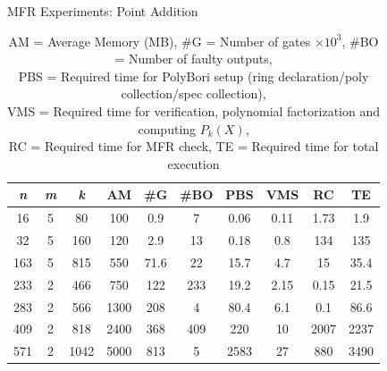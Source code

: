 \begin{frame}{\large MFR Experiments: Point Addition}

{\scriptsize
\begin{table}[bht]
\centering
\caption*{{\scriptsize AM = Average Memory (MB),
\#G = Number of gates $\times 10^3$, \#BO = Number of faulty outputs, 
\\PBS = Required time for PolyBori setup (ring declaration/poly collection/spec collection),
\\VMS = Required time for verification, polynomial factorization and computing $P_k(X)$, \\
RC = Required time for MFR check, TE = Required time for total execution}}
\label{pavsspec}
\begin{tabular}{| c | c | c | c | c | c | c | c | c | c |} \hline
{\textit{\textbf{n}}} & {\textit{\textbf{m}}} & {\textit{\textbf{k}}} & {\textbf{AM}} & {\textbf{\#G}} 
& {\textbf{\#BO}} & {\textbf{PBS}} & {\textbf{VMS}} & {\textbf{RC}} & {\textbf{TE}} \\ \hline 
16 & 5 & 80   & 100 & 0.9  & 7   & 0.06 & 0.11 & 1.73 & 1.9  \\ \hline
32  & 5 & 160  & 120 & 2.9  & 13  & 0.18 & 0.8  & 134  & 135  \\ \hline
163 & 5 & 815  & 550 & 71.6 & 22  & 15.7 & 4.7  & 15   & 35.4 \\ \hline
233 & 2 & 466  & 750 & 122  & 233 & 19.2 & 2.15 & 0.15 & 21.5 \\ \hline
\rowcolor{green}283 & 2 & 566  & 1300& 208  & 4   & 80.4 & 6.1  & 0.1  & 86.6 \\ \hline
\rowcolor{red}409 & 2 & 818  & 2400& 368  & 409 & 220  & 10   & 2007 & 2237 \\ \hline
571 & 2 & 1042 & 5000& 813  & 5   & 2583 & 27   & 880  & 3490 \\ \hline
\end{tabular}
\end{table}}

\end{frame}



